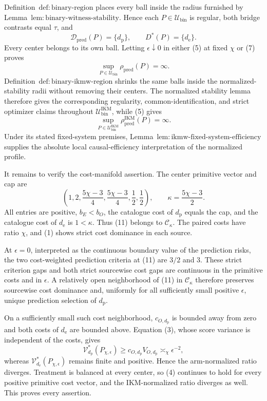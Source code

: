 Definition~\(\mathrm{def{:}binary\text{-}region}\) places every ball inside the radius furnished by Lemma~\(\mathrm{lem{:}binary\text{-}witness\text{-}stability}\). Hence each \(P\in\mathcal U_{\mathrm{bin}}\) is regular, both bridge contrasts equal \(\tau\), and
\[
 \mathcal D_{\mathrm{pred}}(P)=\{d_{\mathrm p}\},
 \qquad
 D^*(P)=\{d_{\mathrm e}\}.                            \tag{8}
\]
Every center belongs to its own ball. Letting \(\epsilon\downarrow0\) in either (5) at fixed \(\chi\) or (7) proves
\[
 \sup_{P\in\mathcal U_{\mathrm{bin}}}\rho_{\mathrm{pred}}(P)=\infty. \tag{9}
\]
Definition~\(\mathrm{def{:}binary\text{-}ikmw\text{-}region}\) shrinks the same balls inside the normalized-stability radii without removing their centers. The normalized stability lemma therefore gives the corresponding regularity, common-identification, and strict optimizer claims throughout \(\mathcal U_{\mathrm{bin}}^{\mathrm{IKM}}\), while (5) gives
\[
 \sup_{P\in\mathcal U_{\mathrm{bin}}^{\mathrm{IKM}}}
 \rho_{\mathrm{pred}}^{\mathrm{IKM}}(P)=\infty.       \tag{10}
\]
Under its stated fixed-system premises, Lemma~\(\mathrm{lem{:}ikmw\text{-}fixed\text{-}system\text{-}efficiency}\) supplies the absolute local causal-efficiency interpretation of the normalized profile.

It remains to verify the cost-manifold assertion. The center primitive vector and cap are
\[
 \left(1,2,\frac{5\chi-3}{4},\frac{5\chi-3}{4},
 \frac12,\frac12\right),
 \qquad \kappa=\frac{5\chi-3}{2}.                     \tag{11}
\]
All entries are positive, \(b_E<b_O\), the catalogue cost of \(d_{\mathrm p}\) equals the cap, and the catalogue cost of \(d_{\mathrm e}\) is \(1<\kappa\). Thus (11) belongs to \(\mathcal C_\kappa\). The paired costs have ratio \(\chi\), and (1) shows strict cost dominance in each source.

At \(\epsilon=0\), interpreted as the continuous boundary value of the prediction risks, the two cost-weighted prediction criteria at (11) are \(3/2\) and \(3\). These strict criterion gaps and both strict sourcewise cost gaps are continuous in the primitive costs and in \(\epsilon\). A relatively open neighborhood of (11) in \(\mathcal C_\kappa\) therefore preserves sourcewise cost dominance and, uniformly for all sufficiently small positive \(\epsilon\), unique prediction selection of \(d_{\mathrm p}\).

On a sufficiently small such cost neighborhood, \(c_{O,d_{\mathrm p}}\) is bounded away from zero and both costs of \(d_{\mathrm e}\) are bounded above. Equation (3), whose score variance is independent of the costs, gives
\[
 \mathcal V_{d_{\mathrm p}}^*(P_{\chi,\epsilon})
 \ge c_{O,d_{\mathrm p}}V_{O,d_{\mathrm p}}
 \asymp_\chi\epsilon^{-2},                            \tag{12}
\]
whereas \(\mathcal V_{d_{\mathrm e}}^*(P_{\chi,\epsilon})\) remains finite and positive. Hence the arm-normalized ratio diverges. Treatment is balanced at every center, so (4) continues to hold for every positive primitive cost vector, and the IKM-normalized ratio diverges as well. This proves every assertion.